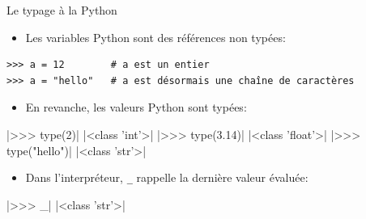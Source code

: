 \documentclass[dvipsnames]{beamer}
\providecommand{\tightlist}{%
  \setlength{\itemsep}{0pt}\setlength{\parskip}{0pt}}
\begin{document}
\begin{frame}[fragile] {Le typage à la Python}

    \begin{itemize}
        \tightlist
        \item Les variables Python sont des références non typées:
    \end{itemize}

    \begin{verbatim}
>>> a = 12        # a est un entier
>>> a = "hello"   # a est désormais une chaîne de caractères
\end{verbatim}

    \begin{itemize}
        \tightlist
        \item En revanche, les valeurs Python sont typées:
    \end{itemize}

    |>>> type(2)|\vspace{-1em}
    |<class 'int'>|\vspace{-1em}
    |>>> type(3.14)|\vspace{-1em}
    |<class 'float'>|\vspace{-1em}
    |>>> type("hello")|\vspace{-1em}
    |<class 'str'>|

    \begin{itemize}
        \tightlist
        \item Dans l'interpréteur, \verb+_+ rappelle la dernière valeur évaluée:
    \end{itemize}

    |>>> _|\vspace{-1em}
    |<class 'str'>|


\end{frame}
\end{document}
